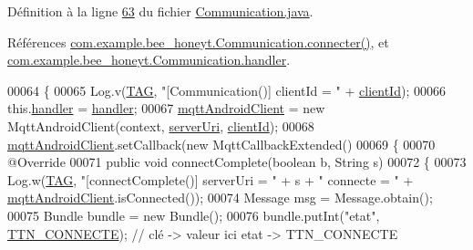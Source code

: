 Définition à la ligne \hyperlink{_communication_8java_source_l00063}{63} du fichier \hyperlink{_communication_8java_source}{Communication.\+java}.



Références \hyperlink{_communication_8java_source_l00131}{com.\+example.\+bee\+\_\+honeyt.\+Communication.\+connecter()}, et \hyperlink{_communication_8java_source_l00039}{com.\+example.\+bee\+\_\+honeyt.\+Communication.\+handler}.


\begin{DoxyCode}
00064     \{
00065         Log.v(\hyperlink{classcom_1_1example_1_1bee__honeyt_1_1_communication_a848338dd9654af654c7e681742666785}{TAG}, \textcolor{stringliteral}{"[Communication()] clientId = "} + \hyperlink{classcom_1_1example_1_1bee__honeyt_1_1_communication_a8b44e0173d57396d5478f767723c23cc}{clientId});
00066         this.\hyperlink{classcom_1_1example_1_1bee__honeyt_1_1_communication_add1a0705dba503c1c4c7a3168a571b20}{handler} = \hyperlink{classcom_1_1example_1_1bee__honeyt_1_1_communication_add1a0705dba503c1c4c7a3168a571b20}{handler};
00067         \hyperlink{classcom_1_1example_1_1bee__honeyt_1_1_communication_a86db63a356e4638c1d39c54bbe64f0e1}{mqttAndroidClient} = \textcolor{keyword}{new} MqttAndroidClient(context, 
      \hyperlink{classcom_1_1example_1_1bee__honeyt_1_1_communication_a19b957478f8d8a0d8319e8459d85862e}{serverUri}, \hyperlink{classcom_1_1example_1_1bee__honeyt_1_1_communication_a8b44e0173d57396d5478f767723c23cc}{clientId});
00068         \hyperlink{classcom_1_1example_1_1bee__honeyt_1_1_communication_a86db63a356e4638c1d39c54bbe64f0e1}{mqttAndroidClient}.setCallback(\textcolor{keyword}{new} MqttCallbackExtended()
00069         \{
00070             @Override
00071             \textcolor{keyword}{public} \textcolor{keywordtype}{void} connectComplete(\textcolor{keywordtype}{boolean} b, String s)
00072             \{
00073                 Log.w(\hyperlink{classcom_1_1example_1_1bee__honeyt_1_1_communication_a848338dd9654af654c7e681742666785}{TAG}, \textcolor{stringliteral}{"[connectComplete()] serverUri = "} + s + \textcolor{stringliteral}{" connecte = "} + 
      \hyperlink{classcom_1_1example_1_1bee__honeyt_1_1_communication_a86db63a356e4638c1d39c54bbe64f0e1}{mqttAndroidClient}.isConnected());
00074                 Message msg = Message.obtain();
00075                 Bundle bundle = \textcolor{keyword}{new} Bundle();
00076                 bundle.putInt(\textcolor{stringliteral}{"etat"}, \hyperlink{classcom_1_1example_1_1bee__honeyt_1_1_communication_ad8ad53a30dea0bfcc57bad80cb67ab92}{TTN\_CONNECTE}); \textcolor{comment}{// clé -> valeur ici etat -> TTN\_CONNECTE}

\end{DoxyCode}
